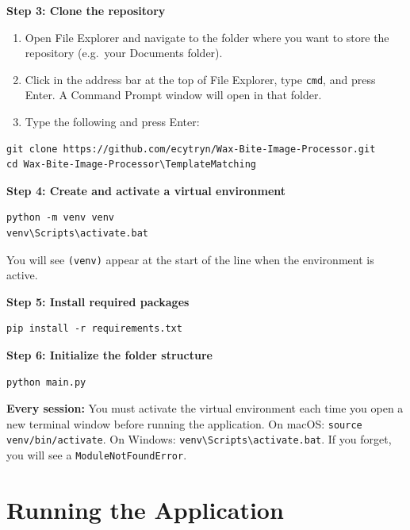 \documentclass[11pt, letterpaper]{article}
\begin{document}
\textbf{Step 3: Clone the repository}

\begin{enumerate}
  \item Open File Explorer and navigate to the folder where you want to store the
        repository (e.g.\ your Documents folder).
  \item Click in the address bar at the top of File Explorer, type \texttt{cmd}, and
        press Enter. A Command Prompt window will open in that folder.
  \item Type the following and press Enter:
\end{enumerate}

\begin{lstlisting}
git clone https://github.com/ecytryn/Wax-Bite-Image-Processor.git
cd Wax-Bite-Image-Processor\TemplateMatching
\end{lstlisting}

\textbf{Step 4: Create and activate a virtual environment}

\begin{lstlisting}
python -m venv venv
venv\Scripts\activate.bat
\end{lstlisting}

You will see \texttt{(venv)} appear at the start of the line when the environment is active.

\textbf{Step 5: Install required packages}

\begin{lstlisting}
pip install -r requirements.txt
\end{lstlisting}

\textbf{Step 6: Initialize the folder structure}

\begin{lstlisting}
python main.py
\end{lstlisting}

\begin{warnbox}
\textbf{Every session:} You must activate the virtual environment each time you open a new
terminal window before running the application. On macOS: \texttt{source venv/bin/activate}.
On Windows: \texttt{venv\textbackslash Scripts\textbackslash activate.bat}. If you forget,
you will see a \texttt{ModuleNotFoundError}.
\end{warnbox}

\section{Running the Application}
\label{sec:running}
\end{document}
